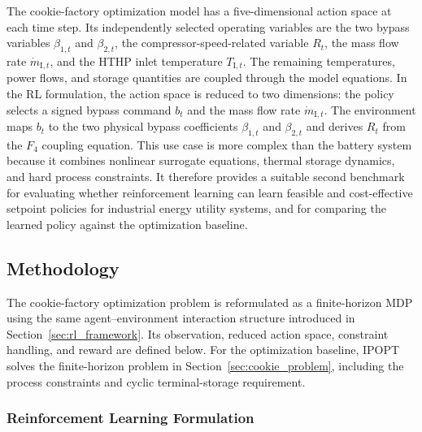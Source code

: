 \documentclass[12pt]{article}
\begin{document}
The cookie-factory optimization model has a five-dimensional action space at each time step. Its independently selected operating variables are the two bypass variables $\beta_{1,t}$ and $\beta_{2,t}$, the compressor-speed-related variable $R_t$, the mass flow rate $\dot{m}_{\mathrm{I},t}$, and the HTHP inlet temperature $T_{\mathrm{I},t}$. The remaining temperatures, power flows, and storage quantities are coupled through the model equations. In the RL formulation, the action space is reduced to two dimensions: the policy selects a signed bypass command $b_t$ and the mass flow rate $\dot{m}_{\mathrm{I},t}$. The environment maps $b_t$ to the two physical bypass coefficients $\beta_{1,t}$ and $\beta_{2,t}$ and derives $R_t$ from the $F_4$ coupling equation. This use case is more complex than the battery system because it combines nonlinear surrogate equations, thermal storage dynamics, and hard process constraints. It therefore provides a suitable second benchmark for evaluating whether reinforcement learning can learn feasible and cost-effective setpoint policies for industrial energy utility systems, and for comparing the learned policy against the optimization baseline.

\FloatBarrier
\subsection{Methodology}
\label{sec:cookie_methodology}

The cookie-factory optimization problem is reformulated as a finite-horizon MDP using the same agent--environment interaction structure introduced in Section~\ref{sec:rl_framework}. Its observation, reduced action space, constraint handling, and reward are defined below. For the optimization baseline, IPOPT solves the finite-horizon problem in Section~\ref{sec:cookie_problem}, including the process constraints and cyclic terminal-storage requirement.

\subsubsection{Reinforcement Learning Formulation}
\label{sec:cookie_rl_framework}
\end{document}
